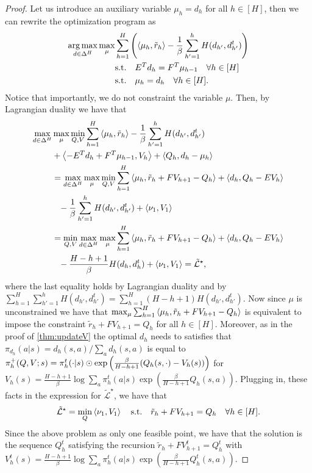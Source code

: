 \begin{proof}
Let us introduce an auxiliary variable $\mu_h = d_h$ for all $h \in [H]$, then we can rewrite the optimization program as
\begin{align*}
\operatorname*{arg\,max}_{d\in\Delta^H }\max_{\mu} &\sum^H_{h=1}\left({\left\langle{\mu_h},{\tilde{r}_h}\right\rangle - \frac{1}{\beta} \sum^h_{h'=1}H(d_{h'},d_{h'}^t)}\right) \\
&\text{s.t.} \quad E^T d_h = F^T \mu_{h-1} \quad \forall h \in [H] \\
&\text{s.t.} \quad \mu_h = d_h \quad \forall h \in [H].
\end{align*}
Notice that importantly, we do not constraint the variable $\mu$. Then, by Lagrangian duality we have that
\begin{align*}
\max_{d\in\Delta^H}&\max_{\mu} \min_{Q, V} \sum^H_{h=1}\left\langle{\mu_h},{\tilde{r}_h}\right\rangle - \frac{1}{\beta} \sum^h_{h'=1}H(d_{h'},d_{h'}^t) \\&+ \left\langle{- E^T d_h + F^T \mu_{h-1}},{V_h}\right\rangle + \left\langle{Q_h},{d_h - \mu_h}\right\rangle \\
&=\max_{d\in\Delta^H}\max_{\mu} \min_{Q, V} 
\sum^H_{h=1}\left\langle{\mu_h},{\tilde{r}_h + F V_{h+1} - Q_h}\right\rangle + \left\langle{d_h},{Q_h - E V_h}\right\rangle \\&\phantom{=} - \frac{1}{\beta} \sum^h_{h'=1}H(d_{h'},d_{h'}^t) + \left\langle{\nu_1},{V_1}\right\rangle
\\
&=\min_{Q, V} \max_{d\in\Delta^H}\max_{\mu} 
\sum^H_{h=1}\left\langle{\mu_h},{\tilde{r}_h + F V_{h+1} - Q_h}\right\rangle + \left\langle{d_h},{Q_h - E V_h}\right\rangle \\&\phantom{=} - \frac{H -h + 1}{\beta}H(d_{h},d_{h}^t) + \left\langle{\nu_1},{V_1}\right\rangle = \tilde{\mathcal{L}}^\star,
\end{align*}
where the last equality holds by Lagrangian duality and by $\sum^H_{h=1} \sum^h_{h'=1} H(d_{h'}, d^t_{h'}) = \sum^H_{h=1} (H -h +1 ) H(d_{h'}, d^t_{h'})$.
Now since $\mu$ is unconstrained we have that $\max_{\mu} \sum^H_{h=1}\left\langle{\mu_h},{\tilde{r}_h + F V_{h+1} - Q_h}\right\rangle $ is equivalent to impose the constraint $\tilde{r}_h + F V_{h+1} = Q_h$ for all $h \in [H]$. Moreover, as in the proof of \cref{thm:updateV} the optimal $d_h$ needs to satisfies that $\pi_{d_h}(a|s) = d_h(s,a)/\sum_a d_h(s,a) $ is equal to
$\pi^{+}_h(Q,V;s) = \pi^t_h(\cdot|s) \odot \exp \left({\frac{\beta}{H-h+1}(Q_h(s,\cdot) - V_h(s))}\right)$
for $V_h(s)= \frac{H-h+1}{\beta} \log \sum_a \pi^t_h(a|s)\exp(\frac{\beta}{H-h+1} Q_h(s,a))$. Plugging in, these facts in the expression for $\tilde{\mathcal{L}}^\star$, we have that
\begin{align*}
    \tilde{\mathcal{L}}^\star = \min_Q \left\langle{\nu_1},{V_1}\right\rangle \quad \text{s.t.}~~~ \tilde{r}_h + F V_{h+1} = Q_h \quad \forall h \in [H].
\end{align*}
Since the above problem as only one feasible point, we have that the solution is the sequence $Q^t_h$ satisfying the recursion $\tilde{r}_h + F V^t_{h+1} = Q^t_h$ with $V^t_h(s)= \frac{H-h+1}{\beta} \log \sum_a \pi^t_h(a|s)\exp(\frac{\beta}{H-h+1} Q^t_h(s,a))$.
\end{proof}

